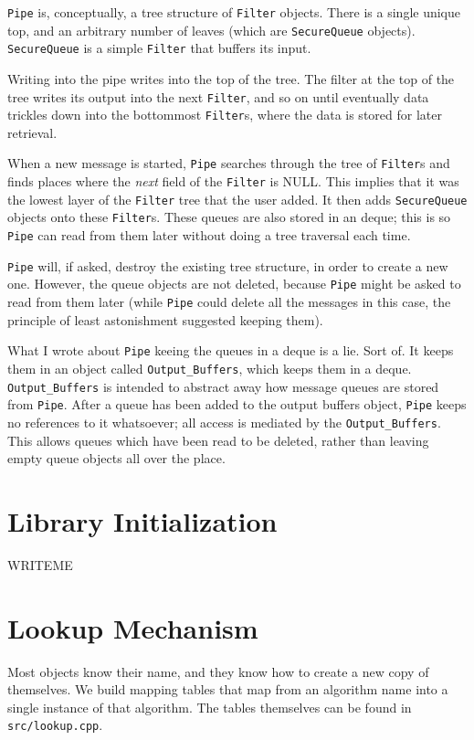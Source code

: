 \documentclass{article}
\newcommand{\filename}[1]{\texttt{#1}}
\newcommand{\type}[1]{\texttt{#1}}
\renewcommand{\arg}[1]{\textsl{#1}}
\begin{document}
\type{Pipe} is, conceptually, a tree structure of \type{Filter}
objects. There is a single unique top, and an arbitrary number of
leaves (which are \type{SecureQueue} objects). \type{SecureQueue} is a
simple \type{Filter} that buffers its input.

Writing into the pipe writes into the top of the tree. The filter at
the top of the tree writes its output into the next \type{Filter}, and
so on until eventually data trickles down into the bottommost
\type{Filter}s, where the data is stored for later retrieval.

When a new message is started, \type{Pipe} searches through the tree
of \type{Filter}s and finds places where the \arg{next} field of the
\type{Filter} is NULL. This implies that it was the lowest layer of
the \type{Filter} tree that the user added. It then adds
\type{SecureQueue} objects onto these \type{Filter}s. These queues are
also stored in an deque; this is so \type{Pipe} can read from them
later without doing a tree traversal each time.

\type{Pipe} will, if asked, destroy the existing tree structure, in
order to create a new one. However, the queue objects are not deleted,
because \type{Pipe} might be asked to read from them later (while
\type{Pipe} could delete all the messages in this case, the principle
of least astonishment suggested keeping them).

What I wrote about \type{Pipe} keeing the queues in a deque is a
lie. Sort of. It keeps them in an object called
\type{Output\_Buffers}, which keeps them in a
deque. \type{Output\_Buffers} is intended to abstract away how message
queues are stored from \type{Pipe}. After a queue has been added to
the output buffers object, \type{Pipe} keeps no references to it
whatsoever; all access is mediated by the \type{Output\_Buffers}.
This allows queues which have been read to be deleted, rather than
leaving empty queue objects all over the place.

\section{Library Initialization}

WRITEME

\section{Lookup Mechanism}

Most objects know their name, and they know how to create a new copy
of themselves. We build mapping tables that map from an algorithm name
into a single instance of that algorithm. The tables themselves can be
found in \filename{src/lookup.cpp}.
\end{document}
